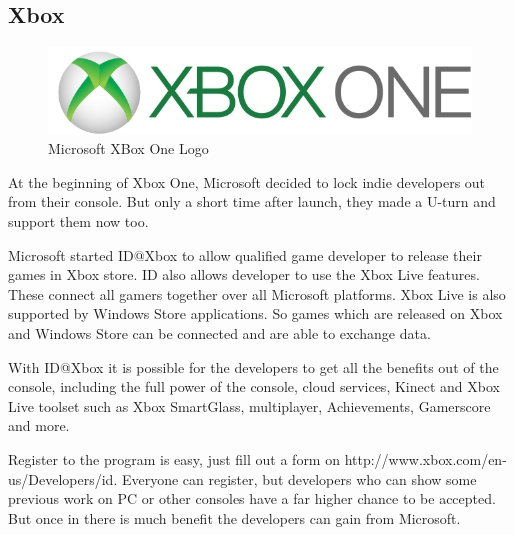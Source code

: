 \subsection{Xbox}
\label{subsec:xbox}

\begin{figure}[!hbp]
\includegraphics[width=\linewidth]{img/xbox.png}
\centering
\caption{ Microsoft XBox One Logo }
\label{fig:xboxone}
\end{figure}
At the beginning of Xbox One, Microsoft decided to lock indie developers out from their console. But only a short time after launch, they made a U-turn and support them now too. \citep{hill_indie_2015}

Microsoft started ID@Xbox to allow qualified game developer to release their games in Xbox store. ID also allows developer to use the Xbox Live features. These connect all gamers together over all Microsoft platforms. Xbox Live is also supported by Windows Store applications. So games which are released on Xbox and Windows Store can be connected and are able to exchange data.

With ID@Xbox it is possible for the developers to get all the benefits out of the console, including the full power of the console, cloud services, Kinect and Xbox Live toolset such as Xbox SmartGlass, multiplayer, Achievements, Gamerscore and more.

Register to the program is easy, just fill out a form on http://www.xbox.com/en-us/Developers/id. Everyone can register, but developers who can show some previous work on PC or other consoles have a far higher chance to be accepted. But once in there is much benefit the developers can gain from Microsoft.

%
%
%

%
